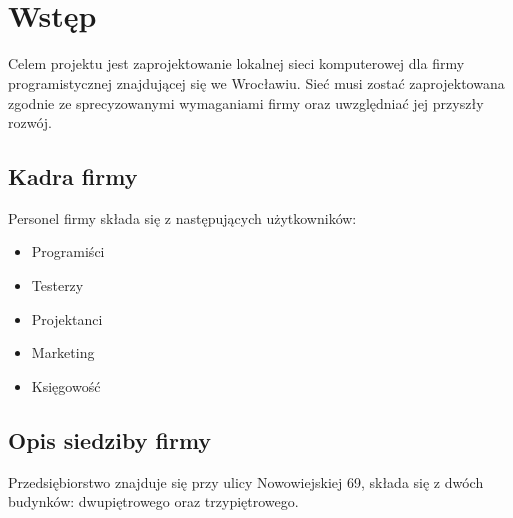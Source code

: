\documentclass[a4paper,12pt]{extarticle}  %
\title{\tytul \\ \small{\opis}}
\author{\tworcy}
\date{\data}
\begin{document}
\maketitle
\tableofcontents
\listoftables
\cleardoublepage
\section{Wstęp}
Celem projektu jest zaprojektowanie lokalnej sieci komputerowej dla firmy programistycznej znajdującej się we Wrocławiu.
Sieć musi zostać zaprojektowana zgodnie ze sprecyzowanymi wymaganiami firmy oraz uwzględniać jej przyszły rozwój.
\subsection{Kadra firmy}

Personel firmy składa się z następujących użytkowników:
\begin{itemize}\label{itemize:kadra}
	\item Programiści
	\item Testerzy
	\item Projektanci
	\item Marketing
	\item Księgowość
\end{itemize}
\subsection{Opis siedziby firmy}
Przedsiębiorstwo znajduje się przy ulicy Nowowiejskiej 69\label{address}, składa się z dwóch budynków: dwupiętrowego oraz trzypiętrowego.
\end{document}
